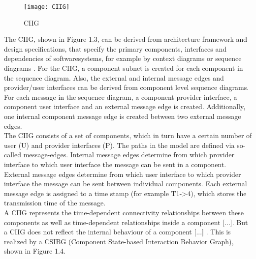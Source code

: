 \begin{figure}[H]
\centering{}\texttt{[image: CIIG]}\caption{CIIG \cite{Guan2015}}
\end{figure}
The CIIG, shown in Figure 1.3, can be derived from architecture framework
and design specifications, that specify the primary components, interfaces
and dependencies of softwaresystems, for example by context diagrams
or sequence diagrams \cite{Guan2015}. For the CIIG, a component subnet
is created for each component in the sequence diagram. Also, the external
and internal message edges and provider/user interfaces can be derived
from component level sequence diagrams. For each message in the sequence
diagram, a component provider interface, a component user interface
and an external message edge is created. Additionally, one internal
component message edge is created between two external message edges.\\
The CIIG consists of a set of components, which in turn have a certain
number of user (U) and provider interfaces (P). The paths in the model
are defined via so-called message-edges. Internal message edges determine
from which provider interface to which user interface the message
can be sent in a component. External message edges determine from
which user interface to which provider interface the message can be
sent between individual components. Each external message edge is
assigned to a time stamp (for example T1-\textgreater 4), which stores
the transmission time of the message. \\
\textquotedbl A CIIG represents the time-dependent connectivity relationships
between these components as well as time-dependent relationships inside
a component {[}...{]}. But a CIIG does not reflect the internal behaviour
of a component {[}...{]}\textquotedbl{} \cite{Guan2015}. This is realized
by a CSIBG (Component State-based Interaction Behavior Graph), shown
in Figure 1.4.

